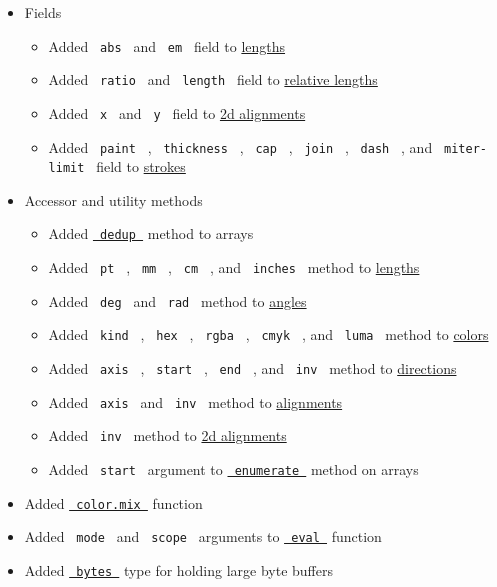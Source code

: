\begin{itemize}
\tightlist
\item
  Fields

  \begin{itemize}
  \tightlist
  \item
    Added \texttt{\ abs\ } and \texttt{\ em\ } field to
    \href{/docs/reference/layout/length/}{lengths}
  \item
    Added \texttt{\ ratio\ } and \texttt{\ length\ } field to
    \href{/docs/reference/layout/relative/}{relative lengths}
  \item
    Added \texttt{\ x\ } and \texttt{\ y\ } field to
    \href{/docs/reference/layout/align/\#parameters-alignment}{2d
    alignments}
  \item
    Added \texttt{\ paint\ } , \texttt{\ thickness\ } , \texttt{\ cap\ }
    , \texttt{\ join\ } , \texttt{\ dash\ } , and
    \texttt{\ miter-limit\ } field to
    \href{/docs/reference/visualize/stroke/}{strokes}
  \end{itemize}
\item
  Accessor and utility methods

  \begin{itemize}
  \tightlist
  \item
    Added
    \href{/docs/reference/foundations/array/\#definitions-dedup}{\texttt{\ dedup\ }}
    method to arrays
  \item
    Added \texttt{\ pt\ } , \texttt{\ mm\ } , \texttt{\ cm\ } , and
    \texttt{\ inches\ } method to
    \href{/docs/reference/layout/length/}{lengths}
  \item
    Added \texttt{\ deg\ } and \texttt{\ rad\ } method to
    \href{/docs/reference/layout/angle/}{angles}
  \item
    Added \texttt{\ kind\ } , \texttt{\ hex\ } , \texttt{\ rgba\ } ,
    \texttt{\ cmyk\ } , and \texttt{\ luma\ } method to
    \href{/docs/reference/visualize/color/}{colors}
  \item
    Added \texttt{\ axis\ } , \texttt{\ start\ } , \texttt{\ end\ } ,
    and \texttt{\ inv\ } method to
    \href{/docs/reference/layout/stack/\#parameters-dir}{directions}
  \item
    Added \texttt{\ axis\ } and \texttt{\ inv\ } method to
    \href{/docs/reference/layout/align/\#parameters-alignment}{alignments}
  \item
    Added \texttt{\ inv\ } method to
    \href{/docs/reference/layout/align/\#parameters-alignment}{2d
    alignments}
  \item
    Added \texttt{\ start\ } argument to
    \href{/docs/reference/foundations/array/\#definitions-enumerate}{\texttt{\ enumerate\ }}
    method on arrays
  \end{itemize}
\item
  Added
  \href{/docs/reference/visualize/color/\#definitions-mix}{\texttt{\ color.mix\ }}
  function
\item
  Added \texttt{\ mode\ } and \texttt{\ scope\ } arguments to
  \href{/docs/reference/foundations/eval/}{\texttt{\ eval\ }} function
\item
  Added \href{/docs/reference/foundations/bytes/}{\texttt{\ bytes\ }}
  type for holding large byte buffers


\end{itemize}
